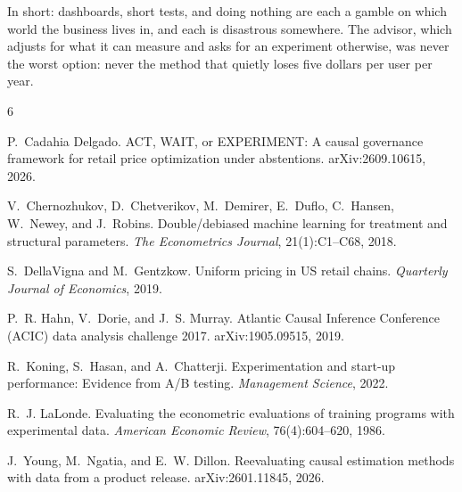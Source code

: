 \documentclass[10pt]{article}
\begin{document}
In short: dashboards, short tests, and doing nothing are each a gamble on
which world the business lives in, and each is disastrous somewhere. The
advisor, which adjusts for what it can measure and asks for an experiment
otherwise, was never the worst option: never the method that quietly
loses five dollars per user per year.

\begin{thebibliography}{6}

P.~Cadahia Delgado.
\newblock ACT, WAIT, or EXPERIMENT: A causal governance framework for retail
  price optimization under abstentions.
\newblock arXiv:2609.10615, 2026.

V.~Chernozhukov, D.~Chetverikov, M.~Demirer, E.~Duflo, C.~Hansen, W.~Newey,
  and J.~Robins.
\newblock Double/debiased machine learning for treatment and structural
  parameters.
\newblock \emph{The Econometrics Journal}, 21(1):C1--C68, 2018.

S.~DellaVigna and M.~Gentzkow.
\newblock Uniform pricing in US retail chains.
\newblock \emph{Quarterly Journal of Economics}, 2019.

P.~R. Hahn, V.~Dorie, and J.~S. Murray.
\newblock Atlantic Causal Inference Conference (ACIC) data analysis
  challenge 2017.
\newblock arXiv:1905.09515, 2019.

R.~Koning, S.~Hasan, and A.~Chatterji.
\newblock Experimentation and start-up performance: Evidence from A/B
  testing.
\newblock \emph{Management Science}, 2022.

R.~J. LaLonde.
\newblock Evaluating the econometric evaluations of training programs with
  experimental data.
\newblock \emph{American Economic Review}, 76(4):604--620, 1986.

J.~Young, M.~Ngatia, and E.~W. Dillon.
\newblock Reevaluating causal estimation methods with data from a product
  release.
\newblock arXiv:2601.11845, 2026.

\end{thebibliography}

\appendix
\end{document}

